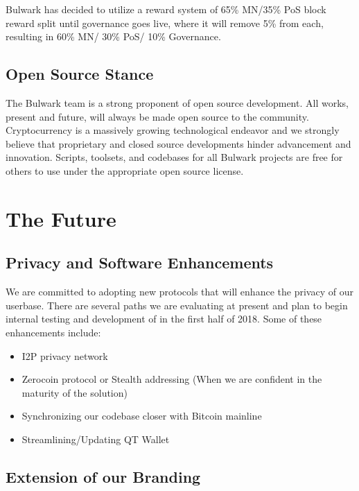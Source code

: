 \documentclass[11pt,a4paperpaper,]{report}
\providecommand{\tightlist}{%
  \setlength{\itemsep}{0pt}\setlength{\parskip}{0pt}}
\begin{document}
Bulwark has decided to utilize a reward system of 65\% MN/35\% PoS block
reward split until governance goes live, where it will remove 5\% from
each, resulting in 60\% MN/ 30\% PoS/ 10\% Governance.

\newpage

\section{Open Source Stance}\label{open-source-stance}

The Bulwark team is a strong proponent of open source development. All
works, present and future, will always be made open source to the
community. Cryptocurrency is a massively growing technological endeavor
and we strongly believe that proprietary and closed source developments
hinder advancement and innovation. Scripts, toolsets, and codebases for
all Bulwark projects are free for others to use under the appropriate
open source license.

\chapter{The Future}\label{the-future}

\section{Privacy and Software
Enhancements}\label{privacy-and-software-enhancements}

We are committed to adopting new protocols that will enhance the privacy
of our userbase. There are several paths we are evaluating at present
and plan to begin internal testing and development of in the first half
of 2018. Some of these enhancements include:

\begin{itemize}
\tightlist
\item
  I2P privacy network
\item
  Zerocoin protocol or Stealth addressing (When we are confident in the
  maturity of the solution)
\item
  Synchronizing our codebase closer with Bitcoin mainline
\item
  Streamlining/Updating QT Wallet
\end{itemize}

\section{Extension of our Branding}\label{extension-of-our-branding}
\end{document}

